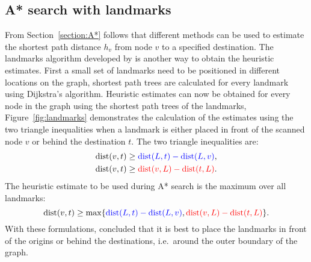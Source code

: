 \subsection{A* search with landmarks}
From Section~\ref{section:A*} follows that
different methods can be used to estimate the shortest path distance $h_v$ from node $v$ to a specified destination.
The landmarks algorithm developed by \citet{GoldbergLandmarks} is another way to obtain the heuristic estimates.
First a small set of landmarks need to be positioned in different locations on the graph,
shortest path trees are calculated for every landmark using Dijkstra's algorithm.
Heuristic estimates can now be obtained for every node in the graph using the shortest path trees of the landmarks,
Figure~\ref{fig:landmarks} demonstrates the calculation of the estimates using the two triangle inequalities when a landmark is either placed in front of the scanned node $v$ or behind the destination $t$.
The two triangle inequalities are:
\begin{align}
     \text{dist}(v, t) & \geq \textcolor{blue}{\text{dist}(L,t)-\text{dist}(L,v)}, \\
     \text{dist}(v, t) & \geq \textcolor{red}{\text{dist}(v,L)-\text{dist}(t,L)}.
\end{align}
The heuristic estimate to be used during A* search is the maximum over all landmarks:
\begin{equation}
  \text{dist}(v,t) \geq \max\{ \textcolor{blue}{\text{dist}(L,t)-\text{dist}(L,v)}, \textcolor{red}{\text{dist}(v,L)-\text{dist}(t,L)} \}.
\end{equation}
With these formulations, \citet{GoldbergLandmarks} concluded that it is best to place the landmarks in front of the origins or behind the destinations,
i.e.\ around the outer boundary of the graph.

